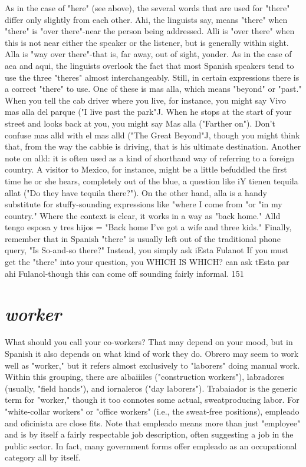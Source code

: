 As in the case of "here" (see above), the several words that are
used for "there" differ only slightly from each other. Ahi, the linguists
say, means "there" when "there" is "over there"-near the person
being addressed. Alli is "over there" when this is not near either the
speaker or the listener, but is generally within sight. Alla is "way over
there"-that is, far away, out of sight, yonder. As in the case of aea and
aqui, the linguists overlook the fact that most Spanish speakers tend
to use the three "theres" almost interchangeably.
Still, in certain expressions there is a correct "there" to use.
One of these is mas alla, which means "beyond" or "past." When you
tell the cab driver where you live, for instance, you might say Vivo
mas alla del parque ("I live past the park"J. When he stops at the start
of your street and looks back at you, you might say Mas alla ("Farther
on"). Don't confuse mas alld with el mas alld ("The Great Beyond"J,
though you might think that, from the way the cabbie is driving, that
is his ultimate destination.
Another note on alld: it is often used as a kind of shorthand
way of referring to a foreign country. A visitor to Mexico, for instance,
might be a little befuddled the first time he or she hears, completely
out of the blue, a question like iY tienen tequila allat ("Do they have
tequila there?"). On the other hand, alla is a handy substitute for
stuffy-sounding expressions like "where I come from "or "in my country." Where the context is clear, it works in a way as "back home."
Alld tengo esposa y tres hijos = "Back home I've got a wife and
three kids."
Finally, remember that in Spanish "there" is usually left out of
the traditional phone query, "Is So-and-so there?" Instead, you simply
ask iEsta Fulanot If you must get the "there" into your question, you
WHICH IS WHICH?
can ask tEsta par ahi Fulanol-though this can come off sounding
fairly informal.
151

\section{\emph{worker}}

What should you call your co-workers? That may depend on
your mood, but in Spanish it also depends on what kind of work they
do. Obrero may seem to work well as "worker," but it refers almost
exclusively to "laborers" doing manual work. Within this grouping,
there are albaiiiles ("construction workers"), labradores (usually,
"field hands"), and iornaleros ("day laborers"). Trabaiador is the generic term for "worker," though it too connotes some actual, sweatproducing labor. For "white-collar workers" or "office workers" (i.e.,
the sweat-free positions), empleado and oficinista are close fits. Note
that empleado means more than just "employee" and is by itself a
fairly respectable job description, often suggesting a job in the public
sector. In fact, many government forms offer empleado as an occupational category all by itself.

